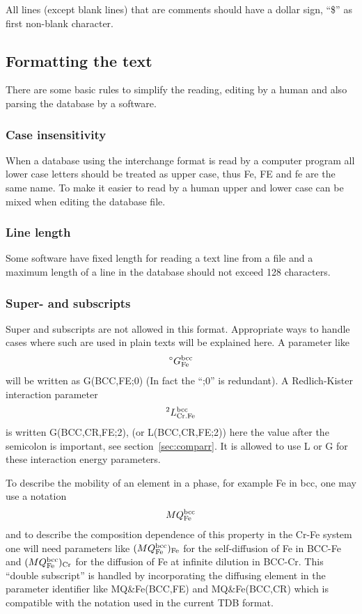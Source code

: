 \documentclass[12pt]{article}
\begin{document}
All lines (except blank lines) that are comments should have a dollar
sign, ``\$'' as first non-blank character.

\subsection{Formatting the text}

There are some basic rules to simplify the reading, editing by a human
and also parsing the database by a software.

\subsubsection{Case insensitivity}

When a database using the interchange format is read by a computer
program all lower case letters should be treated as upper case, thus
Fe, FE and fe are the same name.  To make it easier to read by a human
upper and lower case can be mixed when editing the database file.

\subsubsection{Line length}

Some software have fixed length for reading a text line from a file
and a maximum length of a line in the database should not exceed 128
characters.

\subsubsection{Super- and subscripts}

Super and subscripts are not allowed in this format.  Appropriate ways
to handle cases where such are used in plain texts will be explained
here.  A parameter like
\begin{eqnarray}
^{\circ}G^{\rm bcc}_{\rm Fe} \nonumber
\end{eqnarray}
will be written as G(BCC,FE;0) (In fact the ``;0'' is redundant).  A
Redlich-Kister interaction parameter
\begin{eqnarray}
^{2}L^{\rm bcc}_{\rm Cr.Fe} \nonumber
\end{eqnarray}
is written G(BCC,CR,FE;2), (or L(BCC,CR,FE;2)) here the value after
the semicolon is important, see section~\ref{sec:comparr}.  It is
allowed to use L or G for these interaction energy parameters.

To describe the mobility of an element in a phase, for example Fe in bcc,
one may use a notation
\begin{eqnarray}
MQ^{\rm bcc}_{\rm Fe} \nonumber
\end{eqnarray}
and to describe the composition dependence of this property in the
Cr-Fe system one will need parameters like $(MQ^{\rm bcc}_{\rm Fe})_{\rm Fe}$
for the self-diffusion of Fe in BCC-Fe and $(MQ^{\rm bcc}_{\rm Fe})_{\rm Cr}$
for the diffusion of Fe at infinite dilution
in BCC-Cr.  This ``double subscript'' is handled by incorporating the
diffusing element in the parameter identifier like MQ\&Fe(BCC,FE) and
MQ\&Fe(BCC,CR) which is compatible with the notation used in the
current TDB format.
\end{document}
